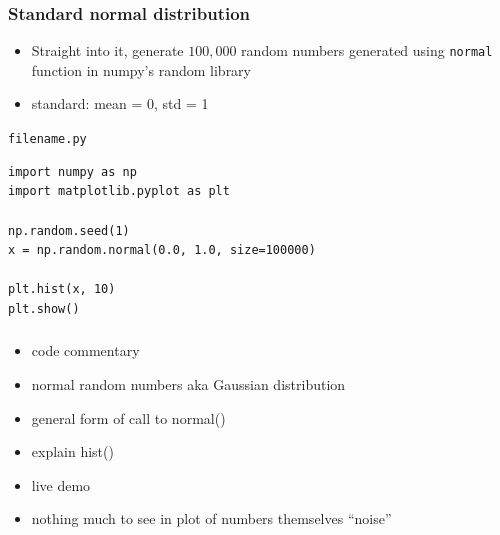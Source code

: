 \documentclass[english,14pt]{beamer}
\begin{document}

\begin{frame}[fragile]

\frametitle{Standard normal distribution}

\begin{itemize}
	\item Straight into it, generate $100,000$ random numbers generated using \texttt{normal} function in numpy's random library
	\item standard: mean = 0, std = 1
\end{itemize}



\texttt{filename.py}
\begin{lstlisting}[style=CStyle,basicstyle=\scriptsize]
import numpy as np
import matplotlib.pyplot as plt

np.random.seed(1)
x = np.random.normal(0.0, 1.0, size=100000)

plt.hist(x, 10)
plt.show() 
\end{lstlisting}

\end{frame}


\begin{frame}[fragile]

\frametitle{}

\begin{itemize}
	\item code commentary
	\item normal random numbers aka Gaussian distribution
	\item general form of call to normal()
	\item explain hist()
	\item live demo
	\item nothing much to see in plot of numbers themselves ``noise'' 
\end{itemize}

\end{frame}

\end{document}
